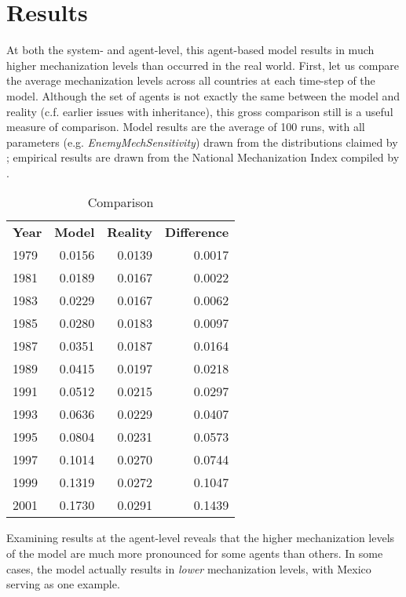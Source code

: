 \documentclass{article}
\begin{document}
\section{Results}

At both the system- and agent-level, this agent-based model results in much
higher mechanization levels than occurred in the real world. First, let us
compare the average mechanization levels across all countries at each time-step
of the model. Although the set of agents is not exactly the same between the
model and reality (c.f. earlier issues with inheritance), this
gross comparison still is a useful measure of comparison. Model results are
the average of 100 runs, with all parameters (e.g.
\textit{EnemyMechSensitivity}) drawn from the distributions claimed by
\citet{sechser2010army}; empirical results are drawn from the National
Mechanization Index compiled by \citet{sechser2010army}.

\begin{table}[h]
	\centering
	\caption{Comparison}
	\begin{tabular}{|l r r r|}
		\hline
		\textbf{Year} & \textbf{Model} & \textbf{Reality} & \textbf{Difference}\\
		1979 & 0.0156 & 0.0139 & 0.0017 \\
		1981 & 0.0189 & 0.0167 & 0.0022 \\
		1983 & 0.0229 & 0.0167 & 0.0062 \\
		1985 & 0.0280 & 0.0183 & 0.0097 \\
		1987 & 0.0351 & 0.0187 & 0.0164 \\
		1989 & 0.0415 & 0.0197 & 0.0218 \\
		1991 & 0.0512 & 0.0215 & 0.0297 \\
		1993 & 0.0636 & 0.0229 & 0.0407 \\
		1995 & 0.0804 & 0.0231 & 0.0573 \\
		1997 & 0.1014 & 0.0270 & 0.0744 \\
		1999 & 0.1319 & 0.0272 & 0.1047 \\
		2001 & 0.1730 & 0.0291 & 0.1439 \\
		\hline
	\end{tabular}
\end{table}

\newpage

Examining results at the agent-level reveals that the higher mechanization
levels of the model are much more pronounced for some agents than others. In
some cases, the model actually results in \textit{lower} mechanization levels,
with Mexico serving as one example. 
\end{document}
